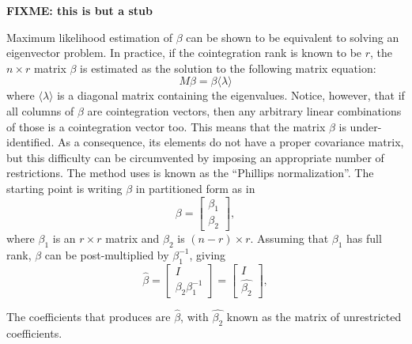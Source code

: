 \textbf{FIXME: this is but a stub}

Maximum likelihood estimation of $\beta$ can be shown to be equivalent
to solving an eigenvector problem. In practice, if the cointegration
rank is known to be $r$, the $n \times r$ matrix $\beta$ is estimated
as the solution to the following matrix equation:
\[
  M \beta = \beta \langle \lambda \rangle
\]
where $\langle \lambda \rangle$ is a diagonal matrix containing the
eigenvalues. Notice, however, that if all columns of $\beta$ are
cointegration vectors, then any arbitrary linear combinations of those
is a cointegration vector too. This means that the matrix $\beta$ is
under-identified. As a consequence, its elements do not have a proper
covariance matrix, but this difficulty can be circumvented by imposing
an appropriate number of restrictions. The method  uses is
known as the ``Phillips normalization''. The starting point is writing
$\beta$ in partitioned form as in
\[
  \beta = \left[
    \begin{array}{c} \beta_1 \\ \beta_2  \end{array}
    \right] ,
\]
where $\beta_1$ is an $r \times r$ matrix and  $\beta_2$ is $(n-r)
\times r$. Assuming that $\beta_1$ has full rank, $\beta$ can be
post-multiplied by $\beta_1^{-1}$, giving
\[
  \hat{\beta} = \left[
    \begin{array}{c} I \\ \beta_2 \beta_1^{-1}  \end{array}
    \right] =
    \left[
    \begin{array}{c} I \\ \hat{\beta_2} \end{array}
  \right]  ,
\]

The coefficients that  produces are $\hat{\beta}$, with
$\hat{\beta_2}$ known as the matrix of unrestricted coefficients.

